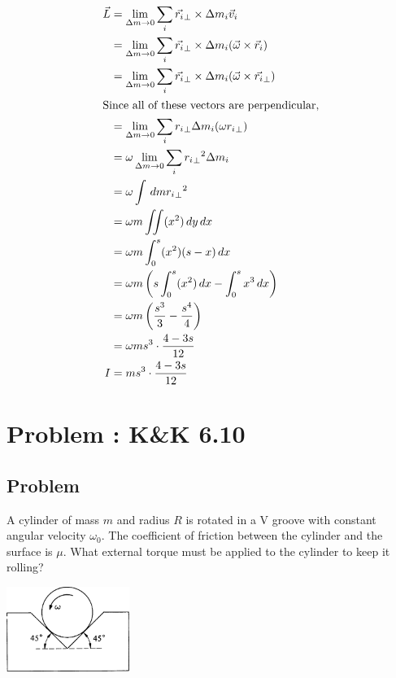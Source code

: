 \documentclass[solutions]{esg8012pset}
\renewcommand{\d}{\,d}
\begin{document}
\begin{enumerate}[(a)]
\begin{align*}
      \vec L & = \lim_{\Delta m\to 0} \sum_{i} \vec {r_i}_{\bot} \times \Delta m_i \vec v_i \\
      & = \lim_{\Delta m\to 0} \sum_{i} \vec {r_i}_{\bot} \times \Delta m_i (\vec \omega \times \vec r_i) \\
      & = \lim_{\Delta m\to 0} \sum_{i} \vec {r_i}_{\bot} \times \Delta m_i (\vec \omega \times \vec {r_i}_{\bot}) \\
    \intertext{Since all of these vectors are perpendicular,}
      & = \lim_{\Delta m\to 0} \sum_{i} {r_i}_{\bot} \Delta m_i (\omega {r_i}_{\bot}) \\
      & = \omega \lim_{\Delta m\to 0} \sum_{i} {{r_i}_{\bot}}^2 \Delta m_i \\
      & = \omega \int \d m {{r_i}_{\bot}}^2 \\
      & = \omega m \iint (x^2)\d y \d x \\
      & = \omega m \int_0^s (x^2)(s-x) \d x \\
      & = \omega m \left(s\int_0^s (x^2) \d x - \int_0^s x^3 \d x\right) \\
      & = \omega m \left(\frac{s^3}{3} - \frac{s^4}{4}\right) \\
      & = \omega m s^3 \cdot \frac{4-3s}{12} \\
    I & = m s^3 \cdot \frac{4-3s}{12}
    \end{align*}
  \end{enumerate}
\section{Problem \thesection: K\&K 6.10}
\subsection{Problem}
  A cylinder of mass $m$ and radius $R$ is rotated in a V groove with constant angular velocity $\omega_{0}$.
The coefficient of friction between the cylinder and the surface is $\mu$. What external torque must be applied to the cylinder to keep it rolling?
  \begin{center}\includegraphics[width=0.3\textwidth]{ps08_4}\end{center}
\end{document}
